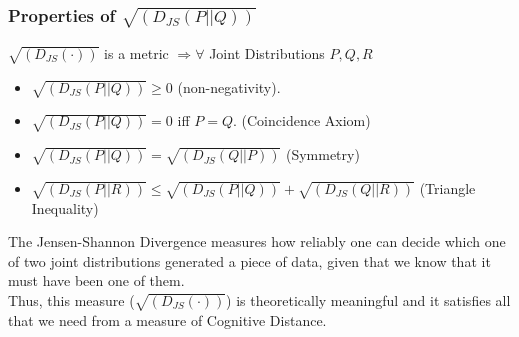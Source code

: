\documentclass{beamer}
\begin{document}
\begin{frame}
\frametitle{Properties of $\sqrt{(D_{JS}(P | | Q))}$}
$\sqrt{(D_{JS}(\cdot))}$ is a metric $\Rightarrow \forall$ Joint Distributions $P, Q, R$
\begin{itemize}
\item $\sqrt{(D_{JS}(P | | Q))} \geq 0$ (non-negativity).
\item $\sqrt{(D_{JS}(P | | Q))} = 0$ iff $P=Q$. {\small(Coincidence Axiom)}
\item $\sqrt{(D_{JS}(P | | Q))} = \sqrt{(D_{JS}(Q | | P))}$ {\small(Symmetry)}
\item $\sqrt{(D_{JS}(P | | R))} \leq \sqrt{(D_{JS}(P | | Q))} + \sqrt{(D_{JS}(Q | | R))}$ {\small(Triangle Inequality)}
\end{itemize}
The Jensen-Shannon Divergence measures how reliably one can decide which one of two joint distributions generated a piece of data, given that we know that it must have been one of them.\\
Thus, this measure ($\sqrt{(D_{JS}(\cdot))}$) is theoretically meaningful and it satisfies all that we need from a measure of Cognitive Distance.
\end{frame}
\end{document}
